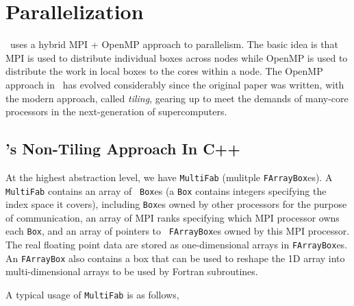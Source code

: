 \section{Parallelization}

\castro\ uses a hybrid MPI + OpenMP approach to parallelism.  The
basic idea is that MPI is used to distribute individual boxes across
nodes while OpenMP is used to distribute the work in local boxes to
the cores within a node.  The OpenMP approach in \castro\ has evolved
considerably since the original paper was written, with the modern
approach, called {\em tiling}, gearing up to meet the demands of
many-core processors in the next-generation of supercomputers.


\subsection{\boxlib's Non-Tiling Approach In C++}
\label{sec:boxlib0}

At the highest abstraction level, we have {\tt MultiFab} (mulitple
{\tt FArrayBox}es).  A {\tt MultiFab} contains an array of {\tt
  Box}es (a {\tt Box} contains integers specifying the index space it
covers), including {\tt Box}es owned by other processors for the
purpose of communication, an array of MPI ranks specifying which MPI
processor owns each {\tt Box}, and an array of pointers to {\tt
  FArrayBox}es owned by this MPI processor.  The real floating point
data are stored as one-dimensional arrays in {\tt FArrayBox}es.  An
{\tt FArrayBox} also contains a box that can be used to reshape the 1D
array into multi-dimensional arrays to be used by Fortran subroutines.

A typical usage of {\tt MultiFab} is as follows,

